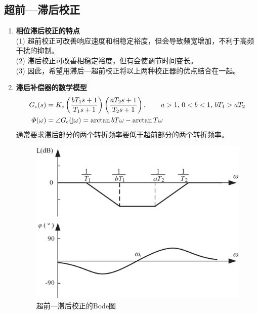 \subsection{超前—滞后校正}\vspace*{-0.5em}
\begin{enumerate}[1. ]
	\item \textbf{相位滞后校正的特点}\\
	(1) 超前校正可改善响应速度和相稳定裕度，但会导致频宽增加，不利于高频干扰的抑制。\\
	(2) 滞后校正可改善相稳定裕度，但有会使调节时间变长。\\
	(3) 因此，希望用滞后—超前校正将以上两种校正器的优点结合在一起。
	
	\item \textbf{滞后补偿器的数学模型}
	\begin{align}
		G_{\text{c}}(s) &= K_c\left(\dfrac{bT_1s + 1}{T_1s + 1}\right) \left(\dfrac{aT_2s + 1}{T_2s + 1}\right), \quad \quad a>1, \, 0 < b < 1, \, bT_1 > aT_2\\
		\varPhi(\omega) &= \angle G_{\text{c}}(\text{j} \omega) = \arctan bT\omega - \arctan T\omega
	\end{align}
	通常要求滞后部分的两个转折频率要低于超前部分的两个转折频率。
	
	\begin{figure}[!htb]
		\centering
		\includegraphics[width=0.55\linewidth]{pic/超前滞后Bode图.pdf}
		\vspace*{-1em}
		\caption{超前—滞后校正的Bode图}
		\label{超前滞后Bode}
	\end{figure}
\end{enumerate}

\vspace*{-2.5em}


